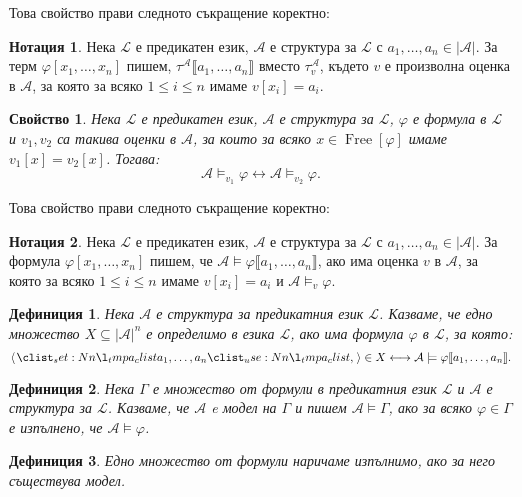 \documentclass[12pt]{article}
\newcommand{\free}{\operatorname{Free}}
\newcommand{\calA}{\mathcal{A}}
\newcommand{\calL}{\mathcal{L}}
\newcommand{\db}[1]{\llbracket #1 \rrbracket}
\newtheorem*{definition}{Дефиниция}
\newtheorem*{property}{Свойство}
\theoremstyle{definition}
\newtheorem*{notation}{Нотация}
\begin{document}
Това свойство прави следното съкращение коректно:
\begin{notation}
  Нека $\calL$ е предикатен език, $\calA$ е структура за $\calL$ с $a_1, \dots, a_n \in |\calA|$.
  За терм $\varphi[x_1, \dots, x_n]$ пишем, $\tau^\calA \db{a_1, \dots, a_n}$ вместо $\tau_v^\calA$, където $v$ е произволна оценка в $\calA$, за която за всяко $1 \leq i \leq n$ имаме $v[x_i] = a_i$.
\end{notation}

\begin{property}
  Нека $\calL$ е предикатен език, $\calA$ е структура за $\calL$, $\varphi$ е формула в $\calL$ и $v_1, v_2$ са такива оценки в $\calA$, за които за всяко $x \in \free[\varphi]$ имаме $v_1[x] = v_2[x]$.
  Тогава:
  \[
    \calA \models_{v_1} \varphi \longleftrightarrow \calA \models_{v_2} \varphi.
  \]
\end{property}

\newpage 

Това свойство прави следното съкращение коректно:
\begin{notation}
  Нека $\calL$ е предикатен език, $\calA$ е структура за $\calL$ с $a_1, \dots, a_n \in |\calA|$.
  За формула $\varphi[x_1, \dots, x_n]$ пишем, че $\calA \models \varphi \db{a_1, \dots, a_n}$, ако има оценка $v$ в $\calA$, за която за всяко $1 \leq i \leq n$ имаме $v[x_i] = a_i$ и $\calA \models_v \varphi$.
\end{notation}

\begin{definition}
    Нека $\calA$ е структура за предикатния език $\calL$.
    Казваме, че едно множество $X \subseteq |\calA|^n$ е определимо в езика $\calL$, ако има формула $\varphi$ в $\calL$, за която:
    \[
    \opair{a_1, \dots, a_n} \in X \longleftrightarrow \calA \models \varphi \db{a_1, \dots, a_n}.
    \]
\end{definition}

\begin{definition}
    Нека $\Gamma$ е множество от формули в предикатния език $\calL$ и $\calA$ е структура за $\calL$.
    Казваме, че $\calA$ e модел на $\Gamma$ и пишем $\calA \models \Gamma$, ако за всяко $\varphi \in \Gamma$ е изпълнено, че $\calA \models \varphi$.
\end{definition}

\begin{definition}
    Едно множество от формули наричаме изпълнимо, ако за него съществува модел.
\end{definition}
\end{document}
